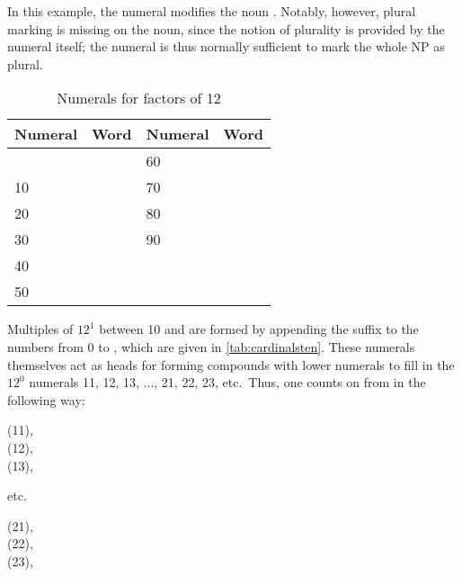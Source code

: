 In this example, the numeral  modifies the noun 
. Notably, however, plural marking is missing on the 
noun, since the notion of plurality is provided by the numeral itself; the 
numeral is thus normally sufficient to mark the whole NP as plural.

\begin{table}[tp]\centering
\caption{Numerals for factors of 12}
\begin{tabu} to .75\linewidth {X[1c] X[2c] X[1c] X[2c]}
\toprule\tableheaderfont
Numeral
	& Word
	& Numeral
	& Word
	\\
\toprule

&
& 60 &  \\

10 & 
& 70 &  \\

20 &   
& 80 &  \\

30 & 
& 90 &  \\

40 & 
&  &  \\

50 & 
&  &  \\

\bottomrule
\end{tabu}
\label{tab:cardinalsten}
\end{table}

Multiples of $12^1$ between 10 and  are formed by appending the suffix
 to the numbers from 0 to \elv, which are given in
\autoref{tab:cardinalsten}. These numerals themselves act as heads for forming
compounds with lower numerals to fill in the $12^0$ numerals 11, 12, 13, ...,
21, 22, 23, etc.\ Thus, one counts on from  in
the  following way:

\pex
\a %
	 (11), \\
	 (12), \\
	 (13),  \medskip
	
	etc.

\a %
	 (21), \\
	 (22), \\
	 (23),  \medskip
	
